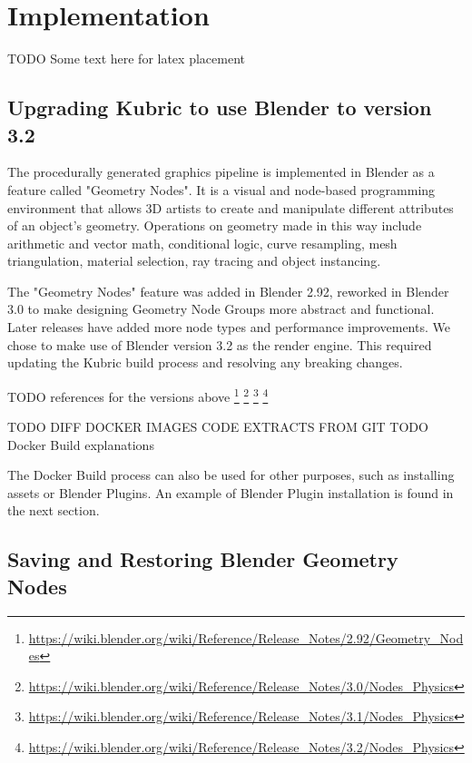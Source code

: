 \chapter{Implementation}
\label{chapter:implementation}


TODO Some text here for latex placement


\section{Upgrading Kubric to use Blender to version 3.2}
\label{sec:upgrading-kubric}

The procedurally generated graphics pipeline is implemented in Blender as a feature called "Geometry Nodes". It is a visual and node-based programming environment that allows 3D artists to create and manipulate different attributes of an object's geometry. Operations on geometry made in this way include arithmetic and vector math, conditional logic, curve resampling, mesh triangulation, material selection, ray tracing and object instancing.

The "Geometry Nodes" feature was added in Blender 2.92, reworked in Blender 3.0 to make designing Geometry Node Groups more abstract and functional. Later releases have added more node types and performance improvements. We chose to make use of Blender version 3.2 as the render engine. This required updating the Kubric build process and resolving any breaking changes.

TODO references for the versions above
\footnote{\url{https://wiki.blender.org/wiki/Reference/Release_Notes/2.92/Geometry_Nodes}}
\footnote{\url{https://wiki.blender.org/wiki/Reference/Release_Notes/3.0/Nodes_Physics}}
\footnote{\url{https://wiki.blender.org/wiki/Reference/Release_Notes/3.1/Nodes_Physics}}
\footnote{\url{https://wiki.blender.org/wiki/Reference/Release_Notes/3.2/Nodes_Physics}}

TODO DIFF DOCKER IMAGES CODE EXTRACTS FROM GIT
TODO Docker Build explanations

The Docker Build process can also be used for other purposes, such as installing assets or Blender Plugins. An example of Blender Plugin installation is found in the next section.


\section{Saving and Restoring Blender Geometry Nodes}
\label{sec:save-restore-blender-geometry}

